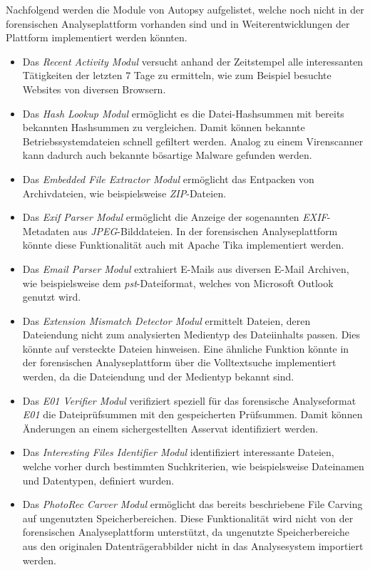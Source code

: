 \noindent
Nachfolgend werden die Module von Autopsy aufgelistet, welche noch nicht in der forensischen Analyseplattform vorhanden sind und in Weiterentwicklungen der Plattform implementiert werden könnten.
\begin{itemize}
\item Das \textit{Recent Activity Modul} versucht anhand der Zeitstempel alle interessanten Tätigkeiten der letzten 7 Tage zu ermitteln, wie zum Beispiel besuchte Websites von diversen Browsern.
\item Das \textit{Hash Lookup Modul} ermöglicht es die Datei-Hashsummen mit bereits bekannten Hashsummen zu vergleichen. Damit können bekannte Betriebssystemdateien schnell gefiltert werden. Analog zu einem Virenscanner kann dadurch auch bekannte bösartige Malware gefunden werden.
\item Das \textit{Embedded File Extractor Modul} ermöglicht das Entpacken von Archivdateien, wie beispielsweise \textit{ZIP}-Dateien.
\item Das \textit{Exif Parser Modul} ermöglicht die Anzeige der sogenannten \textit{EXIF}-Metadaten aus \textit{JPEG}-Bilddateien. In der forensischen Analyseplattform könnte diese Funktionalität auch mit Apache Tika implementiert werden.
\item Das \textit{Email Parser Modul} extrahiert E-Mails aus diversen E-Mail Archiven, wie beispielsweise dem \textit{\acrshort{pst}}-Dateiformat, welches von Microsoft Outlook genutzt wird.
\item Das \textit{Extension Mismatch Detector Modul} ermittelt Dateien, deren Dateiendung nicht zum analysierten Medientyp des Dateiinhalts passen. Dies könnte auf versteckte Dateien hinweisen. Eine ähnliche Funktion könnte in der forensischen Analyseplattform über die Volltextsuche implementiert werden, da die Dateiendung und der Medientyp bekannt sind.
\item Das \textit{E01 Verifier Modul} verifiziert speziell für das forensische Analyseformat \textit{E01} die Dateiprüfsummen mit den gespeicherten Prüfsummen. Damit können Änderungen an einem sichergestellten Asservat identifiziert werden.
\item Das \textit{Interesting Files Identifier Modul} identifiziert interessante Dateien, welche vorher durch bestimmten Suchkriterien, wie beispielsweise Dateinamen und Datentypen, definiert wurden.
\item Das \textit{PhotoRec Carver Modul} ermöglicht das bereits beschriebene File Carving auf ungenutzten Speicherbereichen. Diese Funktionalität wird nicht von der forensischen Analyseplattform unterstützt, da ungenutzte Speicherbereiche aus den originalen Datenträgerabbilder nicht in das Analysesystem importiert werden.

\end{itemize}
